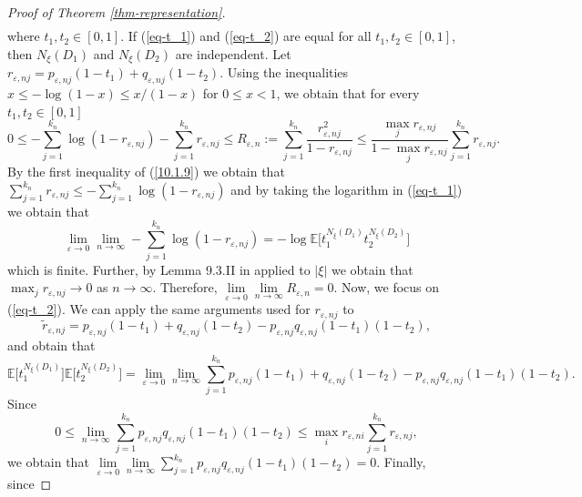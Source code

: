 \documentclass{article}
\theoremstyle{plain}
\theoremstyle{remark}
\begin{document}
\begin{proof}[Proof of Theorem \ref{thm-representation}]
\begin{align}
	\end{align}
	where $t_1,t_2\in[0,1]$. If (\ref{eq-t_1}) and (\ref{eq-t_2}) are equal for all $t_1,t_2\in[0,1]$, then $N_\xi(D_1)$ and $N_\xi(D_2)$ are independent. Let $r_{\varepsilon,nj}=p_{\varepsilon,nj}(1-t_1)+q_{\varepsilon,nj}(1-t_2)$. Using the inequalities $x\leq-\log(1-x)\leq x/(1-x)$ for $0\leq x<1$, we obtain that for every $t_1,t_2\in[0,1]$
	\begin{equation}\label{10.1.9}
		0\leq -\sum_{j=1}^{k_n}\log(1-r_{\varepsilon,nj})-\sum_{j=1}^{k_n}r_{\varepsilon,nj}\leq R_{\varepsilon,n}:=\sum_{j=1}^{k_n}\frac{r_{\varepsilon,nj}^2}{1-r_{\varepsilon,nj}}\leq \frac{\max_j r_{\varepsilon,nj}}{1-\max_j r_{\varepsilon,nj}}\sum_{j=1}^{k_n}r_{\varepsilon,nj}.
	\end{equation}
	By the first inequality of (\ref{10.1.9}) we obtain that $		\sum_{j=1}^{k_n}r_{\varepsilon,nj}\leq -\sum_{j=1}^{k_n}\log(1-r_{\varepsilon,nj})$ and by taking the logarithm in (\ref{eq-t_1}) we obtain that
	\begin{equation*}
		\lim\limits_{\varepsilon\to 0}\lim\limits_{n\to\infty}-\sum_{j=1}^{k_n}\log(1-r_{\varepsilon,nj})=-\log 	\mathbb{E}\big[t_1^{N_\xi(D_1)}t_2^{N_\xi(D_2)}\big]
	\end{equation*}
	which is finite. Further, by Lemma 9.3.II in \cite{Daley} applied to $|\xi|$ we obtain that $\max_j r_{\varepsilon,nj}\to 0$ as $n\to\infty$. Therefore, $\lim\limits_{\varepsilon\to 0}\lim\limits_{n\to\infty}R_{\varepsilon,n}=0$. Now, we focus on (\ref{eq-t_2}). We can apply the same arguments used for $r_{\varepsilon,nj}$ to 
	\begin{equation*}
		\tilde{r}_{\varepsilon,nj}=p_{\varepsilon,nj}(1-t_1)+q_{\varepsilon,nj}(1-t_2)-p_{\varepsilon,nj}q_{\varepsilon,nj}(1-t_1)(1-t_2),
	\end{equation*}
	and obtain that
	\begin{equation*}
		\mathbb{E}\big[t_1^{N_\xi(D_1)}\big]\mathbb{E}\big[t_2^{N_\xi(D_2)}\big]=\lim\limits_{\varepsilon\to 0}\lim\limits_{n\to\infty}\sum_{j=1}^{k_n}p_{\varepsilon,nj}(1-t_1)+q_{\varepsilon,nj}(1-t_2)-p_{\varepsilon,nj}q_{\varepsilon,nj}(1-t_1)(1-t_2).
	\end{equation*}
	Since
	\begin{equation*}
		0\leq\lim\limits_{n\to\infty}\sum_{j=1}^{k_n}p_{\varepsilon,nj}q_{\varepsilon,nj}(1-t_1)(1-t_2)\leq  \max_i r_{\varepsilon,ni}\sum_{j=1}^{k_n}r_{\varepsilon,nj},
	\end{equation*}
	we obtain that $\lim\limits_{\varepsilon\to 0}\lim\limits_{n\to\infty}\sum_{j=1}^{k_n}p_{\varepsilon,nj}q_{\varepsilon,nj}(1-t_1)(1-t_2)=0$. Finally, since 

\end{proof}
\end{document}
